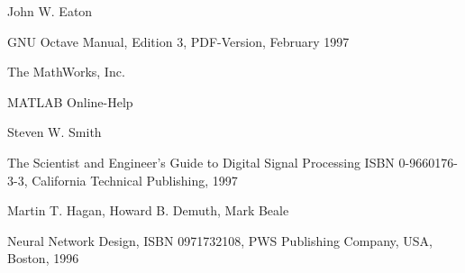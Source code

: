 




%

\begin{thebibliography}{XXXXXXX}

 John W. Eaton

GNU Octave Manual, Edition 3, PDF-Version, February 1997

 The MathWorks, Inc.

MATLAB Online-Help

 Steven W. Smith

The Scientist and Engineer's Guide to Digital Signal Processing
ISBN 0-9660176-3-3, California Technical Publishing, 1997

 Martin T. Hagan, Howard B. Demuth, Mark Beale

Neural Network Design, ISBN 0971732108, PWS Publishing Company, USA, Boston, 1996





\end{thebibliography}
%